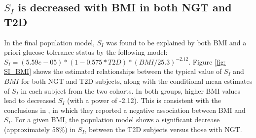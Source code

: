 \documentclass[utf8]{frontiersSCNS} %
\begin{document}
\subsection{$S_I$ is decreased with BMI in both NGT and T2D}
In the final population model, $S_I$ was found to be explained by both BMI and a priori glucose tolerance status by the following model: $S_I=(5.59e-05)*(1-0.575*T2D)*(BMI/25.3)^{-2.12}$. Figure \ref{fig: SI_BMI} shows the estimated relationships between the typical value of $S_I$ and $BMI$ for both NGT and T2D subjects, along with the conditional mean estimates of $S_I$ in each subject from the two cohorts. In both groups, higher BMI values lead to decreased $S_I$ (with a power of -2.12). This is consistent with the conclusions in \citet{Bergman1997TheTolerance}, in which they reported a negative association between BMI and $S_I$. For a given BMI, the population model shows a significant decrease (approximately 58\%) in $S_I$, between the T2D subjects versus those with NGT.
\end{document}
